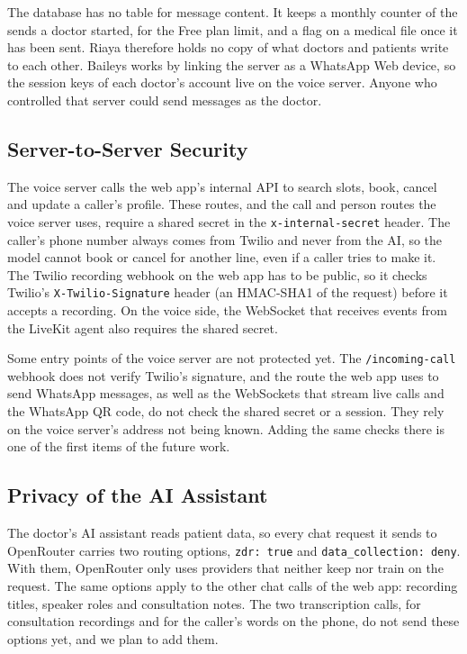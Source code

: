 The database has no table for message content. It keeps a monthly counter of the sends a doctor started, for the Free plan limit, and a flag on a medical file once it has been sent. Riaya therefore holds no copy of what doctors and patients write to each other. Baileys works by linking the server as a WhatsApp Web device, so the session keys of each doctor's account live on the voice server. Anyone who controlled that server could send messages as the doctor.

\subsection{Server-to-Server Security}

The voice server calls the web app's internal API to search slots, book, cancel and update a caller's profile. These routes, and the call and person routes the voice server uses, require a shared secret in the \texttt{x-internal-secret} header. The caller's phone number always comes from Twilio and never from the AI, so the model cannot book or cancel for another line, even if a caller tries to make it. The Twilio recording webhook on the web app has to be public, so it checks Twilio's \texttt{X-Twilio-Signature} header (an HMAC-SHA1 of the request) before it accepts a recording. On the voice side, the WebSocket that receives events from the LiveKit agent also requires the shared secret.

Some entry points of the voice server are not protected yet. The \texttt{/incoming-call} webhook does not verify Twilio's signature, and the route the web app uses to send WhatsApp messages, as well as the WebSockets that stream live calls and the WhatsApp QR code, do not check the shared secret or a session. They rely on the voice server's address not being known. Adding the same checks there is one of the first items of the future work.

\subsection{Privacy of the AI Assistant}

The doctor's AI assistant reads patient data, so every chat request it sends to OpenRouter carries two routing options, \texttt{zdr: true} and \texttt{data\_collection: deny}. With them, OpenRouter only uses providers that neither keep nor train on the request. The same options apply to the other chat calls of the web app: recording titles, speaker roles and consultation notes. The two transcription calls, for consultation recordings and for the caller's words on the phone, do not send these options yet, and we plan to add them.

